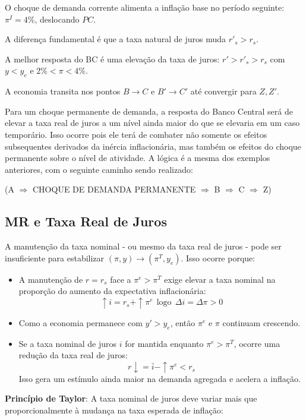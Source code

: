 \documentclass[a4paper,12pt]{article}[abntex2]
\begin{document}
O choque de demanda corrente alimenta a inflação base no período seguinte: \( \pi^I = 4\% \), deslocando \( PC \).

A diferença fundamental é que a taxa natural de juros muda \( r'_s > r_s \).

A melhor resposta do BC é uma elevação da taxa de juros: \( r' > r'_s > r_s \) com \( y < y_e \) e \( 2\% < \pi < 4\% \).

A economia transita nos pontos \( B \to C \) e \( B' \to C' \) até convergir para \( Z, Z' \).

Para um choque permanente de demanda, a resposta do Banco Central será de elevar a taxa real de juros a um nível ainda maior do que se elevaria em um caso temporário. Isso ocorre pois ele terá de combater não somente os efeitos subsequentes derivados da inércia inflacionária, mas também os efeitos do choque permanente sobre o nível de atividade. A lógica é a mesma dos exemplos anteriores, com o seguinte caminho sendo realizado:

(A \( \Rightarrow \) CHOQUE DE DEMANDA PERMANENTE \( \Rightarrow \) B \( \Rightarrow \) C \( \Rightarrow \) Z)


\subsection{\textbf{MR e Taxa Real de Juros}}

A manutenção da taxa nominal - ou mesmo da taxa real de juros - pode ser insuficiente para estabilizar \( (\pi, y) \to (\pi^T, y_e) \). Isso ocorre porque:  \begin{itemize}
    \item A manutenção de \( r = r_s \)  face a \( \pi^e > \pi^T \) exige elevar a taxa nominal na proporção do aumento da expectativa inflacionária:
    \[
    \uparrow i = r_s + \uparrow \pi^e \ \ \text{logo} \ \ \Delta i= \Delta \pi>0
    \]
    \item Como a economia permanece com \( y' > y_e \), então \( \pi^e \) e \( \pi \) continuam crescendo.
    \item Se a taxa nominal de juros \( i \) for mantida enquanto \( \pi^e > \pi^T \), ocorre uma redução da taxa real de juros:
    \[
    r \downarrow = \bar{i} - \uparrow \pi^e < r_s
    \]
    Isso gera um estímulo ainda maior na demanda agregada e acelera a inflação.
\end{itemize}

\textbf{Princípio de Taylor}: A taxa nominal de juros deve variar mais que proporcionalmente à mudança na taxa esperada de inflação:
\end{document}
